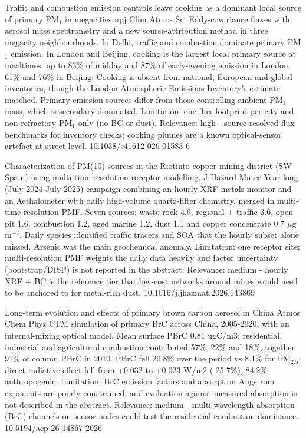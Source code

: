 \documentclass[10pt]{article}
\begin{document}
{Traffic and combustion emission controls leave cooking as a dominant local source of primary PM$_{1}$ in megacities}
{npj Clim Atmos Sci}
{Eddy-covariance fluxes with aerosol mass spectrometry and a new source-attribution method in three megacity neighbourhoods. In Delhi, traffic and combustion dominate primary PM$_{1}$ emission. In London and Beijing, cooking is the largest local primary source at mealtimes: up to 83\% of midday and 87\% of early-evening emission in London, 61\% and 76\% in Beijing. Cooking is absent from national, European and global inventories, though the London Atmospheric Emissions Inventory's estimate matched. Primary emission sources differ from those controlling ambient PM$_{1}$ mass, which is secondary-dominated. Limitation: one flux footprint per city and non-refractory PM$_{1}$ only (no BC or dust). Relevance: high - source-resolved flux benchmarks for inventory checks; cooking plumes are a known optical-sensor artefact at street level.}
{10.1038/s41612-026-01583-6}

{Characterization of PM(10) sources in the Riotinto copper mining district (SW Spain) using multi-time-resolution receptor modelling.}
{J Hazard Mater}
{Year-long (July 2024-July 2025) campaign combining an hourly XRF metals monitor and an Aethalometer with daily high-volume quartz-filter chemistry, merged in multi-time-resolution PMF. Seven sources: waste rock 4.9, regional + traffic 3.6, open pit 1.6, combustion 1.2, aged marine 1.2, dust 1.1 and copper concentrate 0.7 $\mu$g\,m$^{-3}$. Daily species identified traffic tracers and SOA that the hourly subset alone missed. Arsenic was the main geochemical anomaly. Limitation: one receptor site; multi-resolution PMF weights the daily data heavily and factor uncertainty (bootstrap/DISP) is not reported in the abstract. Relevance: medium - hourly XRF + BC is the reference tier that low-cost networks around mines would need to be anchored to for metal-rich dust.}
{10.1016/j.jhazmat.2026.143869}

{Long-term evolution and effects of primary brown carbon aerosol in China}
{Atmos Chem Phys}
{CTM simulation of primary BrC across China, 2005-2020, with an internal-mixing optical model. Mean surface PBrC 0.81 ugC/m3; residential, industrial and agricultural combustion contributed 57\%, 22\% and 18\%, together 91\% of column PBrC in 2010. PBrC fell 20.8\% over the period vs 8.1\% for PM$_{2.5}$; direct radiative effect fell from +0.032 to +0.023 W/m2 (-25.7\%), 84.2\% anthropogenic. Limitation: BrC emission factors and absorption Angstrom exponents are poorly constrained, and evaluation against measured absorption is not described in the abstract. Relevance: medium - multi-wavelength absorption (BrC) channels on sensor nodes could test the residential-combustion dominance.}
{10.5194/acp-26-14867-2026}
\end{document}
